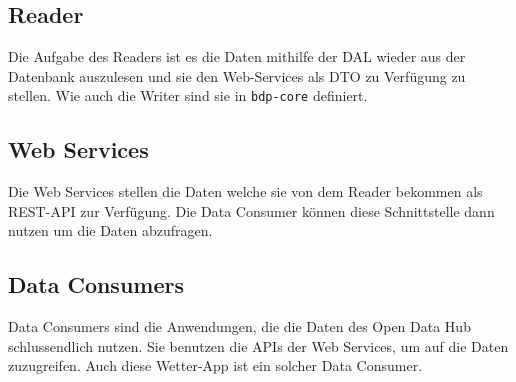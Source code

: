 \documentclass[a4paper,12pt]{article}
\begin{document}
\subsection{Reader}
Die Aufgabe des Readers ist es die Daten mithilfe der DAL wieder aus der
Datenbank auszulesen und sie den Web-Services als DTO zu Verfügung zu stellen.
Wie auch die Writer sind sie in \texttt{bdp-core} \cite{web:bdpcoregit} definiert.

\subsection{Web Services}
Die Web Services stellen die Daten welche sie von dem Reader bekommen als
REST-API zur Verfügung. Die Data Consumer können diese Schnittstelle dann nutzen
um die Daten abzufragen.

\subsection{Data Consumers}
Data Consumers sind die Anwendungen, die die Daten des Open Data Hub
schlussendlich nutzen. Sie benutzen die APIs der Web Services, um auf die Daten
zuzugreifen. Auch diese Wetter-App ist ein solcher Data Consumer.
\end{document}
